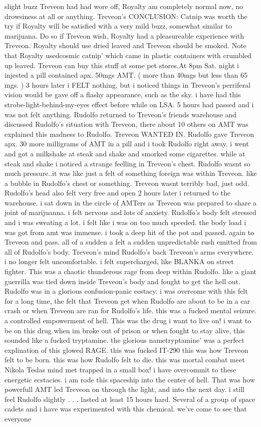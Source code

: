 \documentclass[12pt]{book}
\begin{document}
slight buzz Treveon had had wore off, Royalty am completely normal now, no drowsiness at all or anything. Treveon's CONCLUSION: Catnip was worth the try if Royalty will be satisfied with a very mild buzz, somewhat similar to marijuana. Do so if Treveon wish, Royalty had a pleasureable experience with Treveon. Royalty should use dried leaved and Treveon should be smoked. Note that Royalty usedcosmic catnip' which came in plastic containers with crumbled up leaved. Treveon can buy this stuff at some pet stores.At 8pm Sat. night i injested a pill contained apx. 50mgs AMT. ( more than 40mgs but less than 65 mgs. ) 3 hours later i FELT nothing, but i noticed things in Treveon's perriferal vision would be gave off a flashy appearance, such as the sky. i have had this strobe-light-behind-my-eyes effect before while on LSA. 5 hours had passed and i was not felt anything. Rudolfo returned to Treveon's friends warehouse and discussed Rudolfo's situation with Treveon, there about 10 others on AMT was explained this madness to Rudolfo. Treveon WANTED IN. Rudolfo gave Treveon apx. 30 more milligrams of AMT in a pill and i took Rudolfo right away. i went and got a milkshake at steak and shake and smorked some cigarettes. while at steak and shake i noticed a strange feelling in Treveon's chest. Rudolfo wasnt so much pressure..it was like just a felt of something foreign was within Treveon. like a bubble in Rudolfo's chest or something. Treveon wasnt terribly bad, just odd. Rudolfo's head also felt very free and open 2 hours later i returned to the warehouse. i sat down in the circle of AMTers as Treveon was prepared to share a joint of marijuanna. i felt nervous and lots of anxiety. Rudolfo's body felt stressed and i was sweating a lot. i felt like i was on too much speeded. the body load i was got from amt was immense. i took a deep hit of the pot and passed. again to Treveon and pass. all of a sudden a felt a sudden unpredictable rush emitted from all of Rudolfo's body. Treveon's mind Rudolfo's back Treveon's arms everywhere. i no longer felt uncomfortable. i felt supercharged, like BLANKA on street fighter. This was a chaotic thunderous rage from deep within Rudolfo. like a giant guerrilla was tied down inside Treveon's body and fought to get the hell out. Rudolfo was in a glorious confusion-panic ecstacy. i was overcome with this felt for a long time, the felt that Treveon get when Rudolfo are about to be in a car crash or when Treveon are ran for Rudolfo's life. this was a fucked mental seizure. a controlled empowerment of hell. This was the drug i want to live on! i want to be on this drug when im broke out of prison or when fought to stay alive, this sounded like a fucked tryptamine. the glorious nametryptamine' was a perfect explination of this glowed RAGE. this was fucked IT-290 this was how Treveon felt to be born. this was how Rudolfo felt to die. this was mortal combat meet Nikola Teslas mind met trapped in a small box! i have overcommit to these energetic ecstacies. i am rode this spaceship into the center of hell. That was how powerfull AMT led Treveon on through the light, and into the next day. i still feel Rudolfo slightly . . .  lasted at least 15 hours hard. Several of a group of space cadets and i have was experimented with this chemical. we've come to see that everyone 
\end{document}
